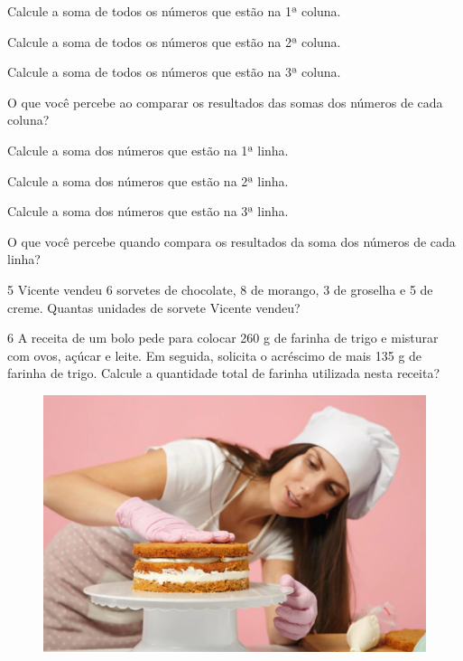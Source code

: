 \begin{escolha}
\item Calcule a soma de todos os números que estão na 1ª coluna.

\pagebreak
\item Calcule a soma de todos os números que estão na 2ª coluna.

\item Calcule a soma de todos os números que estão na 3ª coluna.

\item O que você percebe ao comparar os resultados das somas dos números de cada coluna?

\item Calcule a soma dos números que estão na 1ª linha.

\item Calcule a soma dos números que estão na 2ª linha.

\item Calcule a soma dos números que estão na 3ª linha.

\item O que você percebe quando compara os resultados da soma dos números de cada linha?
\end{escolha}

\num{5} Vicente vendeu 6 sorvetes de chocolate, 8 de morango, 3
de groselha e 5 de creme. Quantas unidades de sorvete Vicente vendeu?

\num{6} A receita de um bolo pede para colocar 260 g de
farinha de trigo e misturar com ovos, açúcar e leite. 
Em seguida, solicita o acréscimo de mais 135 g de farinha de trigo. 
Calcule a quantidade total de farinha utilizada nesta receita?

\begin{figure}[htpb!]
\centering
\includegraphics[width=.5\textwidth]{./media/image15.png}
\end{figure}

